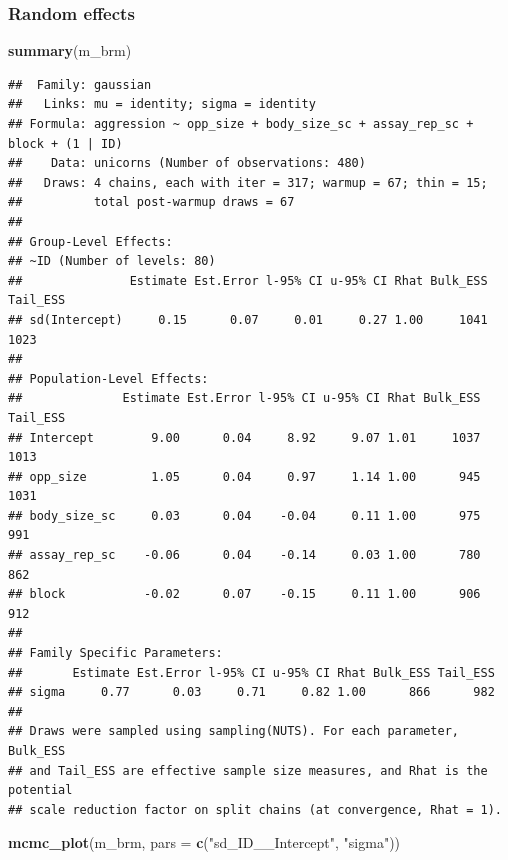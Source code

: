\documentclass[
  12pt,
]{book}
\newenvironment{Shaded}{\begin{snugshade}}{\end{snugshade}}
\newcommand{\DataTypeTok}[1]{\textcolor[rgb]{0.13,0.29,0.53}{#1}}
\newcommand{\KeywordTok}[1]{\textcolor[rgb]{0.13,0.29,0.53}{\textbf{#1}}}
\newcommand{\NormalTok}[1]{#1}
\newcommand{\StringTok}[1]{\textcolor[rgb]{0.31,0.60,0.02}{#1}}
\begin{document}
\hypertarget{random-effects-3}{%
\subsubsection{Random effects}\label{random-effects-3}}

\begin{Shaded}
\begin{Highlighting}[]
\KeywordTok{summary}\NormalTok{(m\_brm)}
\end{Highlighting}
\end{Shaded}

\begin{verbatim}
##  Family: gaussian 
##   Links: mu = identity; sigma = identity 
## Formula: aggression ~ opp_size + body_size_sc + assay_rep_sc + block + (1 | ID) 
##    Data: unicorns (Number of observations: 480) 
##   Draws: 4 chains, each with iter = 317; warmup = 67; thin = 15;
##          total post-warmup draws = 67
## 
## Group-Level Effects: 
## ~ID (Number of levels: 80) 
##               Estimate Est.Error l-95% CI u-95% CI Rhat Bulk_ESS Tail_ESS
## sd(Intercept)     0.15      0.07     0.01     0.27 1.00     1041     1023
## 
## Population-Level Effects: 
##              Estimate Est.Error l-95% CI u-95% CI Rhat Bulk_ESS Tail_ESS
## Intercept        9.00      0.04     8.92     9.07 1.01     1037     1013
## opp_size         1.05      0.04     0.97     1.14 1.00      945     1031
## body_size_sc     0.03      0.04    -0.04     0.11 1.00      975      991
## assay_rep_sc    -0.06      0.04    -0.14     0.03 1.00      780      862
## block           -0.02      0.07    -0.15     0.11 1.00      906      912
## 
## Family Specific Parameters: 
##       Estimate Est.Error l-95% CI u-95% CI Rhat Bulk_ESS Tail_ESS
## sigma     0.77      0.03     0.71     0.82 1.00      866      982
## 
## Draws were sampled using sampling(NUTS). For each parameter, Bulk_ESS
## and Tail_ESS are effective sample size measures, and Rhat is the potential
## scale reduction factor on split chains (at convergence, Rhat = 1).
\end{verbatim}

\begin{Shaded}
\begin{Highlighting}[]
\KeywordTok{mcmc\_plot}\NormalTok{(m\_brm, }\DataTypeTok{pars =} \KeywordTok{c}\NormalTok{(}\StringTok{"sd\_ID\_\_Intercept"}\NormalTok{, }\StringTok{"sigma"}\NormalTok{))}
\end{Highlighting}
\end{Shaded}
\end{document}
